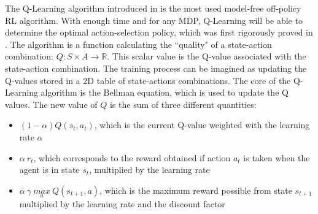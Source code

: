 The Q-Learning algorithm introduced in \cite{watkins1989} is the most used model-free off-policy RL algorithm. With enough time and for any MDP, Q-Learning will be able to determine the optimal action-selection policy, which was first rigorously proved in \cite{qlearningconvergence}. The algorithm is a function calculating the ``quality" of a state-action combination: $Q: S \times A \rightarrow \mathbb{R}$. This scalar value is the Q-value associated with the state-action combination. The training process can be imagined as updating the Q-values stored in a 2D table of state-actions combinations. The core of the Q-Learning algorithm is the Bellman equation, which is used to update the Q values. The new value of $Q$ is the sum of three different quantities: 

\begin{itemize}
	\item $(1-\alpha)Q(s_t,a_t)$, which is the current Q-value weighted with the learning rate $\alpha$
	\item $\alpha \: r_t$, which corresponds to the reward obtained if action $a_t$ is taken when the agent is in state $s_t$, multiplied by the learning rate
	\item $\alpha \: \gamma \: \underset{a}{max} \: Q(s_{t+1},a)$, which is the maximum reward possible from state $s_{t+1}$ multiplied by the learning rate and the discount factor
\end{itemize}


